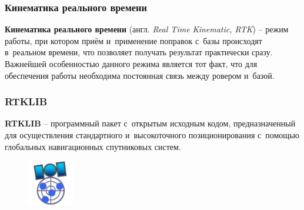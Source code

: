 \documentclass[xetex,t]{beamer}
\begin{document}
%
%
\begin{frame}
  \frametitle{Кинематика реального времени}

  \begin{center}
    \textbf{Кинематика реального времени} (англ. \emph{Real Time Kinematic, RTK}) -- режим работы, при котором приём и~применение поправок с~базы происходят в~реальном времени, что позволяет получать результат практически сразу. Важнейшей особенностью данного режима является тот факт, что для обеспечения работы необходима постоянная связь между ровером и~базой.
  \end{center}

  \vskip 0.25cm

\end{frame}


%
%
\begin{frame}
  \frametitle{RTKLIB}
  
  \begin{center}
    \textbf{RTKLIB} -- программный пакет с~открытым исходным кодом, предназначенный для осуществления стандартного и~высокоточного позиционирования с~помощью глобальных навигационных спутниковых систем.
  \end{center}
  
  \begin{figure}[h]
    \centering
    \includegraphics[height=2cm]{../img/rtklib}
  \end{figure}
\end{frame}
\end{document}
